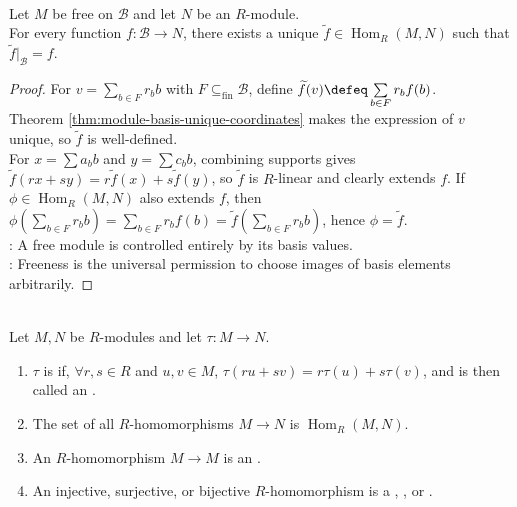 \begin{theorem} \label{thm:free-module-map-extension} \\
Let $M$ be free on $\mathcal{B}$ and let $N$ be an $R$-module.\\
For every function $f:\mathcal{B}\to N$, there exists a unique $\widetilde{f}\in\operatorname{Hom}_R(M,N)$ such that $\widetilde{f}|_{\mathcal{B}}=f$.
\begin{proof} For $v=\sum\limits_{b\in F}r_bb$ with $F\subseteq_{\operatorname{fin}}\mathcal{B}$, define $\widetilde{f}(v)\defeq\sum\limits_{b\in F}r_bf(b)$.\\
Theorem \ref{thm:module-basis-unique-coordinates} makes the expression of $v$ unique, so $\widetilde{f}$ is well-defined.\\
For $x=\sum a_bb$ and $y=\sum c_bb$, combining supports gives $\widetilde{f}(rx+sy)=r\widetilde{f}(x)+s\widetilde{f}(y)$, so $\widetilde{f}$ is $R$-linear and clearly extends $f$. If $\phi\in\operatorname{Hom}_R(M,N)$ also extends $f$, then $\phi\left(\sum\limits_{b\in F}r_bb\right)=\sum\limits_{b\in F}r_bf(b)=\widetilde{f}\left(\sum\limits_{b\in F}r_bb\right)$, hence $\phi=\widetilde{f}$.\\
: A free module is controlled entirely by its basis values.\\
: Freeness is the universal permission to choose images of basis elements arbitrarily.
\end{proof}
\end{theorem}

\begin{definition} \label{def:module-homomorphism} \\
Let $M,N$ be $R$-modules and let $\tau:M\to N$.
\begin{enumerate}[label=(\roman*)]
\setlength{\itemsep}{0pt}
\item $\tau$ is  if, $\forall r,s\in R$ and $u,v\in M$, $\tau(ru+sv)=r\tau(u)+s\tau(v)$, and is then called an .
\item The set of all $R$-homomorphisms $M\to N$ is $\operatorname{Hom}_R(M,N)$.
\item An $R$-homomorphism $M\to M$ is an .
\item An injective, surjective, or bijective $R$-homomorphism is a , , or .
\end{enumerate}
\end{definition}

